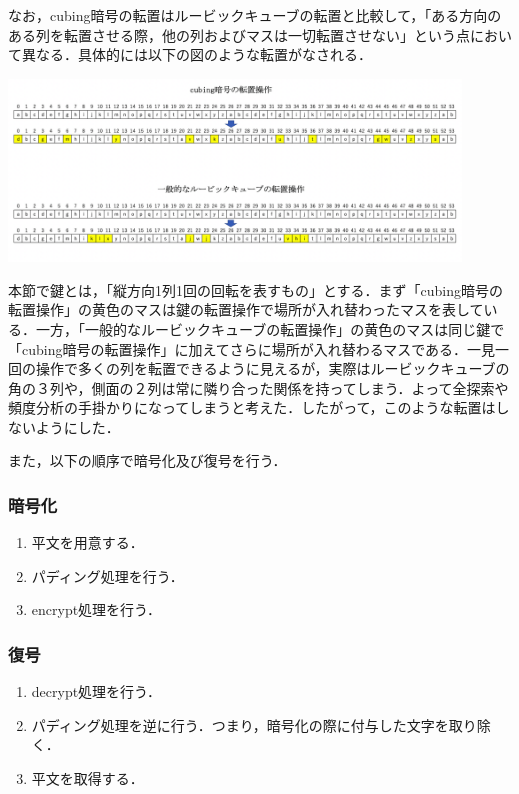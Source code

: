 \documentclass[titlepage]{jarticle}
\begin{document}
なお，cubing暗号の転置はルービックキューブの転置と比較して，「ある方向のある列を転置させる際，他の列およびマスは一切転置させない」という点において異なる．具体的には以下の図のような転置がなされる．
\begin{center}
  \includegraphics[width=12cm]{./tex_pic/trans.png}\\
\end{center}
本節で鍵とは，「縦方向1列1回の回転を表すもの」とする．まず「cubing暗号の転置操作」の黄色のマスは鍵の転置操作で場所が入れ替わったマスを表している．一方，「一般的なルービックキューブの転置操作」の黄色のマスは同じ鍵で「cubing暗号の転置操作」に加えてさらに場所が入れ替わるマスである．一見一回の操作で多くの列を転置できるように見えるが，実際はルービックキューブの角の３列や，側面の２列は常に隣り合った関係を持ってしまう．よって全探索や頻度分析の手掛かりになってしまうと考えた．したがって，このような転置はしないようにした．

また，以下の順序で暗号化及び復号を行う．
\subsubsection{暗号化}
\begin{screen}
  \begin{enumerate}
    \item 平文を用意する．
    \item パディング処理を行う．
    \item encrypt処理を行う．
  \end{enumerate}
\end{screen}

\subsubsection{復号}
\begin{screen}
  \begin{enumerate}
    \item decrypt処理を行う．
    \item パディング処理を逆に行う．つまり，暗号化の際に付与した文字を取り除く．
    \item 平文を取得する．
  \end{enumerate}
\end{screen}
\end{document}
